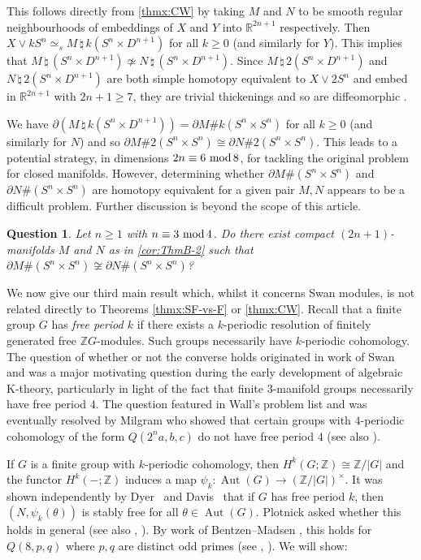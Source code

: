 \documentclass[11pt,leqno,a4paper]{amsart}
\newcommand{\R}{\mathbb{R}}
\newcommand{\Z}{\mathbb{Z}}
\renewcommand{\mod}{\,\,\text{\normalfont mod}\,}
\DeclareMathOperator{\Aut}{Aut}
\newtheorem{question}[thm]{Question}
\theoremstyle{definition}
\theoremstyle{remark}
\theoremstyle{custom}
\begin{document}
This follows directly from \cref{thmx:CW} by taking $M$ and $N$ to be smooth regular neighbourhoods of embeddings of $X$ and $Y$ into $\R^{2n+1}$ respectively. Then $X \vee kS^n \simeq_s M \, \natural \, k(S^n \times D^{n+1})$ for all $k \ge 0$ (and similarly for $Y$). This implies that $M \, \natural \, (S^n \times D^{n+1}) \not \simeq N \, \natural \, (S^n \times D^{n+1})$. Since $M \, \natural \, 2(S^n \times D^{n+1})$ and $N \, \natural \, 2(S^n \times D^{n+1})$ are both simple homotopy equivalent to $X \vee 2S^n$ and embed in $\R^{2n+1}$ with $2n+1 \ge 7$, they are trivial thickenings and so are diffeomorphic \cite[p76]{Wa66}. 

We have $\partial(M \, \natural \, k(S^n \times D^{n+1})) = \partial M \# k(S^n \times S^n)$ for all $k \ge 0$ (and similarly for $N$) and so $\partial M \# 2(S^n \times S^n) \cong \partial N \# 2(S^n \times S^n)$. This leads to a potential strategy, in dimensions $2n \equiv 6 \mod 8$, for tackling the original problem for closed manifolds. However, determining whether $\partial M \# (S^n \times S^n)$ and $\partial N \# (S^n \times S^n)$ are homotopy equivalent for a given pair $M, N$ appears to be a difficult problem. Further discussion is beyond the scope of this article.

\begin{question}
Let $n \ge 1$ with $n \equiv 3 \mod 4$. Do there exist compact $(2n+1)$-manifolds $M$ and $N$ as in \cref{cor:ThmB-2} such that $\partial M \# (S^n \times S^n) \not \cong \partial N \# (S^n \times S^n)$?
\end{question}

We now give our third main result which, whilst it concerns Swan modules, is not related directly to Theorems \ref{thmx:SF-vs-F} or \ref{thmx:CW}. Recall that a finite group $G$ has \textit{free period $k$} if there exists a $k$-periodic resolution of finitely generated free $\Z G$-modules. Such groups necessarily have $k$-periodic cohomology. The question of whether or not the converse holds originated in work of Swan \cite{Sw60-II} and was a major motivating question during the early development of algebraic K-theory, particularly in light of the fact that finite $3$-manifold groups necessarily have free period $4$. The question featured in Wall's problem list \cite[Problem A3]{Wa79} and was eventually resolved by Milgram \cite{Mi85} who showed that certain groups with $4$-periodic cohomology of the form $Q(2^na,b,c)$ do not have free period $4$ (see also \cite{Da81,DM85}).

If $G$ is a finite group with $k$-periodic cohomology, then $H^k(G;\Z) \cong \Z/|G|$ and the functor $H^k(-;\Z)$ induces a map $\psi_k : \Aut(G) \to (\Z/|G|)^\times$. It was shown independently by Dyer~\cite[Note (b) p276]{Dy76} and Davis~\cite{Da83} that if $G$ has free period $k$, then $(N,\psi_k(\theta))$ is stably free for all $\theta \in \Aut(G)$.
Plotnick \cite[p98]{Pl82} asked whether this holds in general (see also \cite[p488]{Da83}, \cite[Question 7.3]{Ni20a}). 
By work of Bentzen--Madsen \cite[p448]{BM83}, this holds for $Q(8,p,q)$ where $p, q$ are distinct odd primes (see \cite[Corollary 4.4]{BM83}, \cite[p231]{Ma83}).
We will show:
\end{document}
